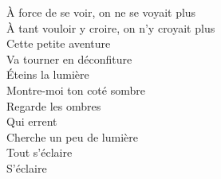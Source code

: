 À force de se voir, on ne se voyait plus \\
À tant vouloir y croire, on n'y croyait plus \\
Cette petite aventure \\
Va tourner en déconfiture \\
Éteins la lumière \\
Montre-moi ton coté sombre \\
Regarde les ombres \\
Qui errent \\
Cherche un peu de lumière \\
Tout s'éclaire \\
S'éclaire \\
